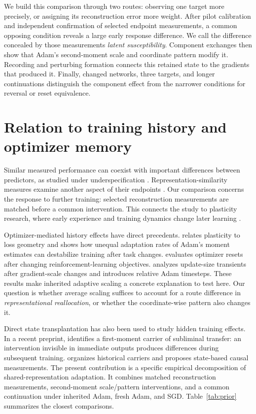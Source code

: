 We build this comparison through two routes: observing one target more precisely, or assigning its reconstruction error more weight. After pilot calibration and independent confirmation of selected endpoint measurements, a common opposing condition reveals a large early response difference. We call the difference concealed by those measurements \emph{latent susceptibility}. Component exchanges then show that Adam's second-moment scale and coordinate pattern modify it. Recording and perturbing formation connects this retained state to the gradients that produced it. Finally, changed networks, three targets, and longer continuations distinguish the component effect from the narrower conditions for reversal or reset equivalence.

\section{Relation to training history and optimizer memory}
\label{sec:related}
Similar measured performance can coexist with important differences between predictors, as studied under underspecification \citep{damour2022underspecification}. Representation-similarity measures examine another aspect of their endpoints \citep{kornblith2019similarity}. Our comparison concerns the response to further training: selected reconstruction measurements are matched before a common intervention. This connects the study to plasticity research, where early experience and training dynamics change later learning \citep{achille2019critical,jastrzebski2020breakeven,dohare2024plasticity}.

Optimizer-mediated history effects have direct precedents. \citet{lyle2023plasticity} relates plasticity to loss geometry and shows how unequal adaptation rates of Adam's moment estimates can destabilize training after task changes. \citet{asadi2023resetting} evaluates optimizer resets after changing reinforcement-learning objectives. \citet{ellis2024local} analyzes update-size transients after gradient-scale changes and introduces relative Adam timesteps. These results make inherited adaptive scaling a concrete explanation to test here. Our question is whether average scaling suffices to account for a route difference in \emph{representational reallocation}, or whether the coordinate-wise pattern also changes it.

Direct state transplantation has also been used to study hidden training effects. In a recent preprint, \citet{xu2026optimizer} identifies a first-moment carrier of subliminal transfer: an intervention invisible in immediate outputs produces differences during subsequent training. \citet{sevetlidis2026trainingmemory} organizes historical carriers and proposes state-based causal measurements. The present contribution is a specific empirical decomposition of shared-representation adaptation. It combines matched reconstruction measurements, second-moment scale/pattern interventions, and a common continuation under inherited Adam, fresh Adam, and SGD. Table~\ref{tab:prior} summarizes the closest comparisons.

